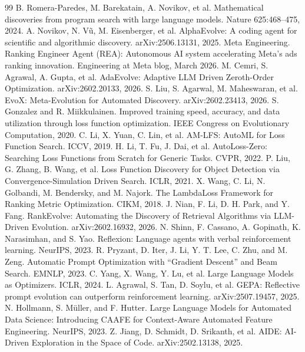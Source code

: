 \documentclass[]{ceurart}
\begin{document}
\begin{thebibliography}{99}
 B. Romera-Paredes, M. Barekatain, A. Novikov, et al.
Mathematical discoveries from program search with large language models.
Nature 625:468--475, 2024.
 A. Novikov, N. V\~{u}, M. Eisenberger, et al.
AlphaEvolve: A coding agent for scientific and algorithmic discovery.
arXiv:2506.13131, 2025.
 Meta Engineering. Ranking Engineer Agent (REA): Autonomous AI
system accelerating Meta's ads ranking innovation. Engineering at Meta blog,
March 2026.
 M. Cemri, S. Agrawal, A. Gupta, et al. AdaEvolve:
Adaptive LLM Driven Zeroth-Order Optimization. arXiv:2602.20133, 2026.
 S. Liu, S. Agarwal, M. Maheswaran, et al. EvoX:
Meta-Evolution for Automated Discovery. arXiv:2602.23413, 2026.
 S. Gonzalez and R. Miikkulainen. Improved training speed,
accuracy, and data utilization through loss function optimization. IEEE
Congress on Evolutionary Computation, 2020.
 C. Li, X. Yuan, C. Lin, et al. AM-LFS: AutoML for Loss
Function Search. ICCV, 2019.
 H. Li, T. Fu, J. Dai, et al. AutoLoss-Zero: Searching
Loss Functions from Scratch for Generic Tasks. CVPR, 2022.
 P. Liu, G. Zhang, B. Wang, et al. Loss Function
Discovery for Object Detection via Convergence-Simulation Driven Search.
ICLR, 2021.
 X. Wang, C. Li, N. Golbandi, M. Bendersky, and
M. Najork. The LambdaLoss Framework for Ranking Metric Optimization. CIKM,
2018.
 J. Nian, F. Li, D. H. Park, and Y. Fang. RankEvolve:
Automating the Discovery of Retrieval Algorithms via LLM-Driven Evolution.
arXiv:2602.16932, 2026.
 N. Shinn, F. Cassano, A. Gopinath, K. Narasimhan, and
S. Yao. Reflexion: Language agents with verbal reinforcement learning.
NeurIPS, 2023.
 R. Pryzant, D. Iter, J. Li, Y. T. Lee, C. Zhu, and
M. Zeng. Automatic Prompt Optimization with ``Gradient Descent'' and Beam
Search. EMNLP, 2023.
 C. Yang, X. Wang, Y. Lu, et al. Large Language Models as
Optimizers. ICLR, 2024.
 L. Agrawal, S. Tan, D. Soylu, et al. GEPA: Reflective prompt
evolution can outperform reinforcement learning. arXiv:2507.19457, 2025.
 N. Hollmann, S. M\"{u}ller, and F. Hutter. Large Language
Models for Automated Data Science: Introducing CAAFE for Context-Aware
Automated Feature Engineering. NeurIPS, 2023.
 Z. Jiang, D. Schmidt, D. Srikanth, et al. AIDE: AI-Driven
Exploration in the Space of Code. arXiv:2502.13138, 2025.

\end{thebibliography}
\end{document}
